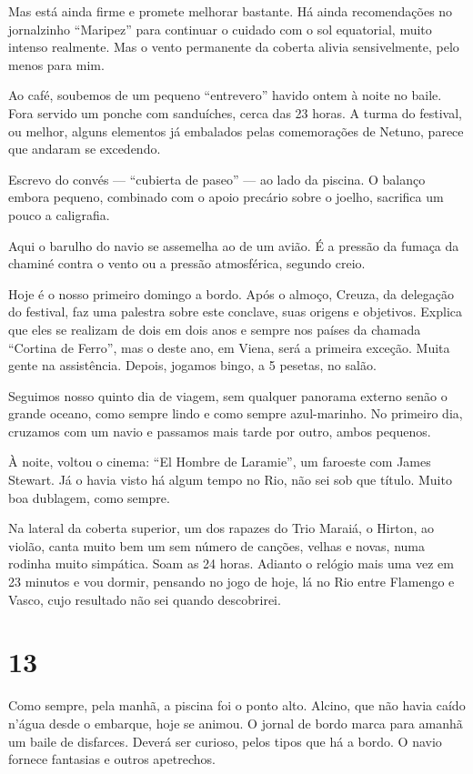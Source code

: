 Mas está ainda firme e promete melhorar bastante. Há ainda recomendações no jornalzinho ``Maripez'' para continuar o cuidado com o sol equatorial, muito intenso realmente. Mas o vento permanente da coberta alivia sensivelmente, pelo menos para mim.

Ao café, soubemos de um pequeno ``entrevero'' havido ontem à noite no baile. Fora servido um ponche com sanduíches, cerca das 23 horas. A turma do festival, ou melhor, alguns elementos já embalados pelas comemorações de Netuno, parece que andaram se excedendo.

Escrevo do convés --- ``cubierta de paseo'' --- ao lado da piscina. O balanço embora pequeno, combinado com o apoio precário sobre o joelho, sacrifica um pouco a caligrafia.

Aqui o barulho do navio se assemelha ao de um avião. É a pressão da fumaça da chaminé contra o vento ou a pressão atmosférica, segundo creio.

Hoje é o nosso primeiro domingo a bordo. Após o almoço, Creuza, da delegação do festival, faz uma palestra sobre este conclave, suas origens e objetivos. Explica que eles se realizam de dois em dois anos e sempre nos países da chamada ``Cortina de Ferro'', mas o deste ano, em Viena, será a primeira exceção. Muita gente na assistência. Depois, jogamos bingo, a 5 pesetas, no salão.

Seguimos nosso quinto dia de viagem, sem qualquer panorama externo senão o grande oceano, como sempre lindo e como sempre azul-marinho. No primeiro dia, cruzamos com um navio e passamos mais tarde por outro, ambos pequenos.

À noite, voltou o cinema: ``El Hombre de Laramie'', um faroeste com James Stewart. Já o havia visto há algum tempo no Rio, não sei sob que título. Muito boa dublagem, como sempre.

Na lateral da coberta superior, um dos rapazes do Trio Maraiá, o Hirton, ao violão, canta muito bem um sem número de canções, velhas e novas, numa rodinha muito simpática. Soam as 24 horas. Adianto o relógio mais uma vez em 23 minutos e vou dormir, pensando no jogo de hoje, lá no Rio entre Flamengo e Vasco, cujo resultado não sei quando descobrirei.

\section*{13 \adfflatleafright {}}

Como sempre, pela manhã, a piscina foi o ponto alto. Alcino, que não havia caído n’água desde o embarque, hoje se animou. O jornal de bordo marca para amanhã um baile de disfarces. Deverá ser curioso, pelos tipos que há a bordo. O navio fornece fantasias e outros apetrechos.

